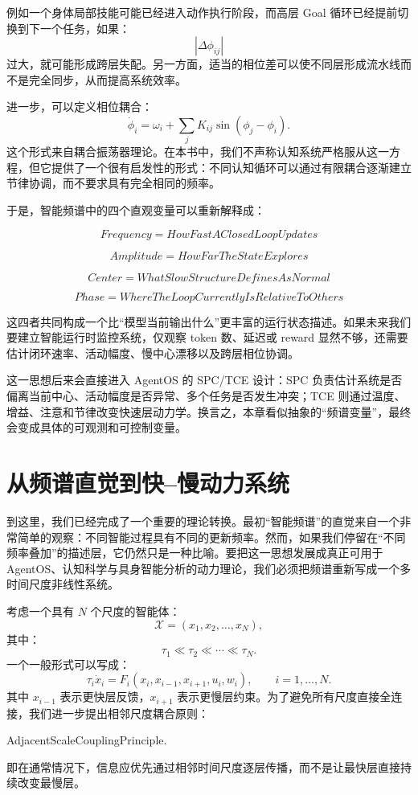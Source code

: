 例如一个身体局部技能可能已经进入动作执行阶段，而高层 Goal 循环已经提前切换到下一个任务，如果：
\[
|\Delta\phi_{ij}|
\]
过大，就可能形成跨层失配。另一方面，适当的相位差可以使不同层形成流水线而不是完全同步，从而提高系统效率。

进一步，可以定义相位耦合：
\[
\dot{\phi}_i
=
\omega_i
+
\sum_j
K_{ij}
\sin
(\phi_j-\phi_i).
\]
这个形式来自耦合振荡器理论。在本书中，我们不声称认知系统严格服从这一方程，但它提供了一个很有启发性的形式：不同认知循环可以通过有限耦合逐渐建立节律协调，而不要求具有完全相同的频率。

于是，智能频谱中的四个直观变量可以重新解释成：

\[
\boxed{
Frequency
=
HowFastAClosedLoopUpdates
}
\]

\[
\boxed{
Amplitude
=
HowFarTheStateExplores
}
\]

\[
\boxed{
Center
=
WhatSlowStructureDefinesAsNormal
}
\]

\[
\boxed{
Phase
=
WhereTheLoopCurrentlyIsRelativeToOthers
}
\]

这四者共同构成一个比“模型当前输出什么”更丰富的运行状态描述。如果未来我们要建立智能运行时监控系统，仅观察 token 数、延迟或 reward 显然不够，还需要估计闭环速率、活动幅度、慢中心漂移以及跨层相位协调。

这一思想后来会直接进入 AgentOS 的 SPC/TCE 设计：SPC 负责估计系统是否偏离当前中心、活动幅度是否异常、多个任务是否发生冲突；TCE 则通过温度、增益、注意和节律改变快速层动力学。换言之，本章看似抽象的“频谱变量”，最终会变成具体的可观测和可控制变量。

\section{从频谱直觉到快--慢动力系统}

到这里，我们已经完成了一个重要的理论转换。最初“智能频谱”的直觉来自一个非常简单的观察：不同智能过程具有不同的更新频率。然而，如果我们停留在“不同频率叠加”的描述层，它仍然只是一种比喻。要把这一思想发展成真正可用于 AgentOS、认知科学与具身智能分析的动力理论，我们必须把频谱重新写成一个多时间尺度非线性系统。

考虑一个具有 $N$ 个尺度的智能体：
\[
\mathcal{X}
=
(x_1,x_2,\ldots,x_N),
\]
其中：
\[
\tau_1
\ll
\tau_2
\ll
\cdots
\ll
\tau_N.
\]
一个一般形式可以写成：
\[
\tau_i
\dot{x}_i
=
F_i
\left(
x_i,
x_{i-1},
x_{i+1},
u_i,
w_i
\right),
\qquad
i=1,\ldots,N.
\]
其中 $x_{i-1}$ 表示更快层反馈，$x_{i+1}$ 表示更慢层约束。为了避免所有尺度直接全连接，我们进一步提出相邻尺度耦合原则：
\begin{statementbox}
AdjacentScaleCouplingPrinciple.
\end{statementbox}
即在通常情况下，信息应优先通过相邻时间尺度逐层传播，而不是让最快层直接持续改变最慢层。

